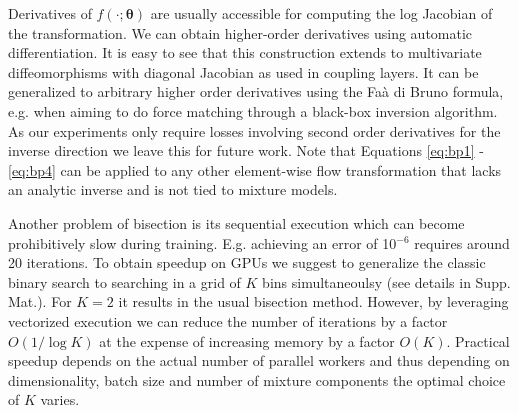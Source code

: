 \documentclass{article}
\begin{document}
Derivatives of $f(\cdot; \bm\theta)$ are usually accessible for computing the log Jacobian of the transformation. We can obtain higher-order derivatives using automatic differentiation.
It is easy to see that this construction extends to multivariate diffeomorphisms with diagonal Jacobian as used in coupling layers.
It can be generalized to arbitrary higher order derivatives using the Faà di Bruno formula, e.g. when aiming to do force matching through a black-box inversion algorithm. As our experiments only require losses involving second order derivatives for the inverse direction we leave this for future work.
Note that Equations \eqref{eq:bp1} - \eqref{eq:bp4} can be applied to any other element-wise flow transformation that lacks an analytic inverse and is not tied to mixture models.

Another problem of bisection is its sequential execution which can become prohibitively slow during training.
E.g. achieving an error of 10$^{-6}$ requires around 20 iterations. 
To obtain speedup on GPUs we suggest to generalize the classic binary search to searching in a grid of $K$ bins simultaneoulsy (see details in Supp. Mat.). For $K=2$ it results in the usual bisection method. However, by leveraging vectorized execution we can reduce the number of iterations by a factor $O\left(1 / \log K\right)$ at the expense of increasing memory by a factor $O\left(K\right)$. Practical speedup depends on the actual number of parallel workers and thus depending on dimensionality, batch size and number of mixture components the optimal choice of $K$ varies.

%  
\end{document}
